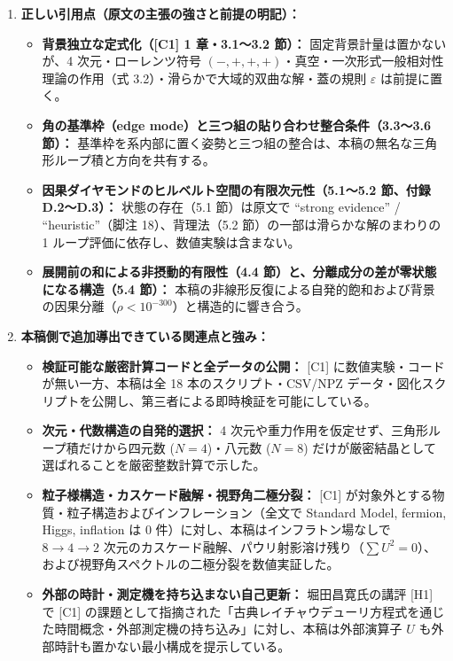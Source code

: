 \documentclass[
  a4paper,
]{ltjsarticle}
\providecommand{\tightlist}{%
  \setlength{\itemsep}{0pt}\setlength{\parskip}{0pt}}
\begin{document}
\begin{enumerate}
\def\labelenumi{\arabic{enumi}.}
\tightlist
\item
  \textbf{正しい引用点（原文の主張の強さと前提の明記）：}

  \begin{itemize}
  \tightlist
  \item
    \textbf{背景独立な定式化（{[}C1{]} 1 章・3.1〜3.2 節）：}
    固定背景計量は置かないが、4 次元・ローレンツ符号
    \((-,+,+,+)\)・真空・一次形式一般相対性理論の作用（式
    3.2）・滑らかで大域的双曲な解・蓋の規則 \(\varepsilon\)
    は前提に置く。
  \item
    \textbf{角の基準枠（edge
    mode）と三つ組の貼り合わせ整合条件（3.3〜3.6 節）：}
    基準枠を系内部に置く姿勢と三つ組の整合は、本稿の無名な三角形ループ積と方向を共有する。
  \item
    \textbf{因果ダイヤモンドのヒルベルト空間の有限次元性（5.1〜5.2
    節、付録 D.2〜D.3）：} 状態の存在（5.1 節）は原文で ``strong
    evidence'' / ``heuristic''（脚注 18）、背理法（5.2
    節）の一部は滑らかな解のまわりの 1
    ループ評価に依存し、数値実験は含まない。
  \item
    \textbf{展開前の和による非摂動的有限性（4.4
    節）と、分離成分の差が零状態になる構造（5.4 節）：}
    本稿の非線形反復による自発的飽和および背景の因果分離（\(\rho < 10^{-300}\)）と構造的に響き合う。
  \end{itemize}
\item
  \textbf{本稿側で追加導出できている関連点と強み：}

  \begin{itemize}
  \tightlist
  \item
    \textbf{検証可能な厳密計算コードと全データの公開：} {[}C1{]}
    に数値実験・コードが無い一方、本稿は全 18 本のスクリプト・CSV/NPZ
    データ・図化スクリプトを公開し、第三者による即時検証を可能にしている。
  \item
    \textbf{次元・代数構造の自発的選択：} 4
    次元や重力作用を仮定せず、三角形ループ積だけから四元数
    (\(N=4\))・八元数 (\(N=8\))
    だけが厳密結晶として選ばれることを厳密整数計算で示した。
  \item
    \textbf{粒子様構造・カスケード融解・視野角二極分裂：} {[}C1{]}
    が対象外とする物質・粒子構造およびインフレーション（全文で Standard
    Model, fermion, Higgs, inflation は 0
    件）に対し、本稿はインフラトン場なしで \(8 \to 4 \to 2\)
    次元のカスケード融解、パウリ射影溶け残り（\(\sum U^2 = 0\)）、および視野角スペクトルの二極分裂を数値実証した。
  \item
    \textbf{外部の時計・測定機を持ち込まない自己更新：} 堀田昌寛氏の講評
    {[}H1{]} で {[}C1{]}
    の課題として指摘された「古典レイチャウデューリ方程式を通じた時間概念・外部測定機の持ち込み」に対し、本稿は外部演算子
    \(U\) も外部時計も置かない最小構成を提示している。
  \end{itemize}
\end{enumerate}
\end{document}
